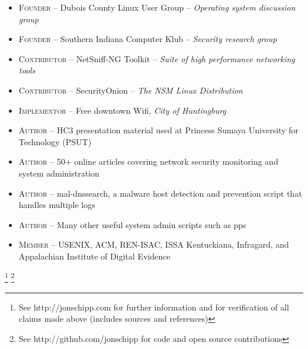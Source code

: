 \documentclass[10pt,letterpaper]{article}
\begin{document}
\begin{itemize}
	\parskip=0.1em

	\item \textsc{Founder} -- Dubois County Linux User Group – \textit{Operating system discussion group}
	\item \textsc{Founder} -- Southern Indiana Computer Klub – \textit{Security research group}
	\item \textsc{Contributor} -- NetSniff-NG Toolkit – \textit{Suite of high performance networking tools}
	\item \textsc{Contributor} -- SecurityOnion – \textit{The NSM Linux Distribution}
	\item \textsc{Implementor} -- Free downtown Wifi, \textit{City of Huntingburg}
	\item \textsc{Author} -- HC3 presentation material used at Princess Sumaya University for Technology (PSUT)
	\item \textsc{Author} -- 50+ online articles covering network security monitoring and system administration
	\item \textsc{Author} -- mal-dnssearch, a malware host detection and prevention script that handles multiple logs
	\item \textsc{Author} -- Many other useful system admin scripts such as pps
	\item \textsc{Member} -- USENIX, ACM, REN-ISAC, ISSA Kentuckiana, Infragard, and Appalachian Institute of Digital Evidence

\end{itemize}

\let\thefootnote\relax\footnote{See http://jonschipp.com for further
information and for verification of all claims made above (includes sources and references)}
\let\thefootnote\relax\footnote{See http://github.com/jonschipp for code and open source contributions}
\end{document}
